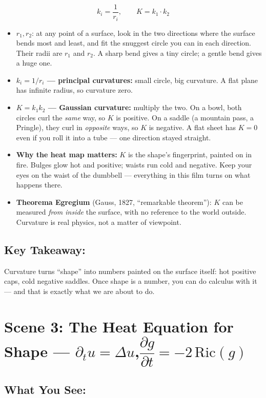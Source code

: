\documentclass[11pt]{article}
\begin{document}
\[
k_i = \frac{1}{r_i}, \qquad K = k_1 \cdot k_2
\]

\begin{itemize}
  \item \textbf{\( r_1, r_2 \)}: at any point of a surface, look in the two directions
  where the surface bends most and least, and fit the snuggest circle you can in each
  direction. Their radii are $r_1$ and $r_2$. A sharp bend gives a tiny circle; a
  gentle bend gives a huge one.
  \item \textbf{\( k_i = 1/r_i \) --- principal curvatures:} small circle, big
  curvature. A flat plane has infinite radius, so curvature zero.
  \item \textbf{\( K = k_1 k_2 \) --- Gaussian curvature:} multiply the two. On a
  bowl, both circles curl the \emph{same} way, so $K$ is positive. On a saddle (a
  mountain pass, a Pringle), they curl in \emph{opposite} ways, so $K$ is negative.
  A flat sheet has $K = 0$ even if you roll it into a tube --- one direction stayed
  straight.
  \item \textbf{Why the heat map matters:} $K$ is the shape's fingerprint, painted on
  in fire. Bulges glow hot and positive; waists run cold and negative. Keep your eyes
  on the waist of the dumbbell --- everything in this film turns on what happens there.
  \item \textbf{Theorema Egregium} (Gauss, 1827, ``remarkable theorem''): $K$ can be
  measured \emph{from inside} the surface, with no reference to the world outside.
  Curvature is real physics, not a matter of viewpoint.
\end{itemize}

\subsection*{Key Takeaway:}

Curvature turns ``shape'' into numbers painted on the surface itself: hot positive
caps, cold negative saddles. Once shape is a number, you can do calculus with it ---
and that is exactly what we are about to do.

\hrulefill

\section*{Scene 3: The Heat Equation for Shape --- \( \partial_t u = \Delta u \),\quad \( \dfrac{\partial g}{\partial t} = -2\,\mathrm{Ric}(g) \)}

\subsection*{What You See:}
\end{document}
